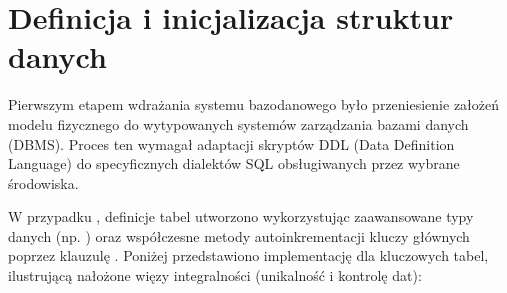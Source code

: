 \documentclass[a4paper,11pt,english,openany,oneside]{sphinxmanual}
\begin{document}
\section{Definicja i inicjalizacja struktur danych}
\label{\detokenize{rozdzial_4/index:definicja-i-inicjalizacja-struktur-danych}}
\sphinxAtStartPar
Pierwszym etapem wdrażania systemu bazodanowego było przeniesienie założeń modelu fizycznego do wytypowanych systemów zarządzania bazami danych (DBMS). Proces ten wymagał adaptacji skryptów DDL (Data Definition Language) do specyficznych dialektów SQL obsługiwanych przez wybrane środowiska.

\sphinxAtStartPar
W przypadku , definicje tabel utworzono wykorzystując zaawansowane typy danych (np. ) oraz współczesne metody autoinkrementacji kluczy głównych poprzez klauzulę . Poniżej przedstawiono implementację dla kluczowych tabel, ilustrującą nałożone więzy integralności (unikalność i kontrolę dat):
\end{document}
